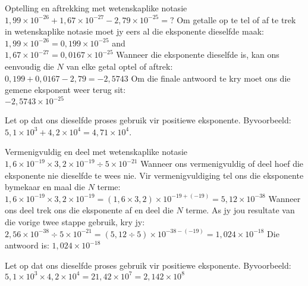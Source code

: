 \begin{wex}{Optelling en aftrekking met wetenskaplike notasie}
 {$1,99 \times 10^{-26} + 1,67 \times 10^{-27} - 2,79 \times 10^{-25} = ?$}
{
Om getalle op te tel of af te trek in wetenskaplike notasie moet jy eers al die eksponente dieselfde maak: \\
$1,99 \times 10^{-26} = 0,199 \times 10^{-25}$ and\\
$1,67 \times 10^{-27} = 0,0167 \times 10^{-25}$
Wanneer die eksponente dieselfde is, kan ons eenvoudig die $N$ van elke getal optel of aftrek:\\
$0,199 + 0,0167 - 2,79 = -2,5743$ 
Om die finale antwoord te kry moet ons die gemene eksponent weer terug sit:\\
$-2,5743 \times 10^{-25}$
}
\end{wex}
Let op dat ons dieselfde proses gebruik vir positiewe eksponente. Byvoorbeeld: $5,1 \times 10^{3} + 4,2 \times 10^{4} = 4,71 \times 10^{4}$. 
\begin{wex}{Vermenigvuldig en deel met wetenskaplike notasie}
 {$1,6 \times 10^{-19} \times 3,2 \times 10^{-19} \div 5 \times 10^{-21} $}
{ 
Wanneer ons vermenigvuldig of deel hoef die eksponente nie dieselfde te wees nie. Vir vermenigvuldiging tel ons die eksponente bymekaar en maal die $N$ terme:\\
$1,6 \times 10^{-19} \times 3,2 \times 10^{-19} = (1,6 \times 3,2) \times 10^{-19 + (-19)} = 5,12 \times 10^{-38}$
Wanneer ons deel trek ons die eksponente af en deel die $N$ terme. As jy jou resultate van die vorige twee stappe gebruik, kry jy:\\
$2,56 \times 10^{-38} \div 5 \times 10^{-21} = (5,12 \div 5) \times 10^{-38 - (-19)} = 1,024 \times 10^{-18}$
Die antwoord is: $1,024 \times 10^{-18}$
}
\end{wex}
Let op dat ons dieselfde proses gebruik vir positiewe eksponente. Byvoorbeeld: $5,1 \times 10^{3} \times 4,2 \times 10^{4} = 21,42 \times 10^{7} = 2,142 \times 10^{8}$
